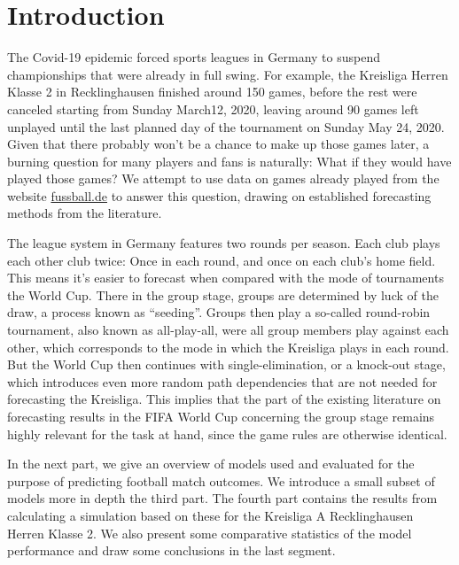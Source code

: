 \documentclass[12pt,a4paper]{article}
\begin{document}
\hypertarget{introduction}{%
\section{Introduction}\label{introduction}}

The Covid-19 epidemic forced sports leagues in Germany to suspend
championships that were already in full swing. For example, the
Kreisliga Herren Klasse 2 in Recklinghausen finished around 150 games,
before the rest were canceled starting from Sunday March12, 2020,
leaving around 90 games left unplayed until the last planned day of the
tournament on Sunday May 24, 2020. Given that there probably won't be a
chance to make up those games later, a burning question for many players
and fans is naturally: What if they would have played those games? We
attempt to use data on games already played from the website
\href{http://www.fussball.de/spielplan/re-kl-a-2-kreis-recklinghausen-kreisliga-a-herren-saison1920-westfalen/-/staffel/027II28DS800000DVS5489B3VS3GHJJU-G\#!/section/matchplan}{fussball.de}
to answer this question, drawing on established forecasting methods from
the literature.

The league system in Germany features two rounds per season. Each club
plays each other club twice: Once in each round, and once on each club's
home field. This means it's easier to forecast when compared with the
mode of tournaments the World Cup. There in the group stage, groups are
determined by luck of the draw, a process known as \enquote{seeding}.
Groups then play a so-called round-robin tournament, also known as
all-play-all, were all group members play against each other, which
corresponds to the mode in which the Kreisliga plays in each round. But
the World Cup then continues with single-elimination, or a knock-out
stage, which introduces even more random path dependencies that are not
needed for forecasting the Kreisliga. This implies that the part of the
existing literature on forecasting results in the FIFA World Cup
concerning the group stage remains highly relevant for the task at hand,
since the game rules are otherwise identical.

In the next part, we give an overview of models used and evaluated for
the purpose of predicting football match outcomes. We introduce a small
subset of models more in depth the third part. The fourth part contains
the results from calculating a simulation based on these for the
Kreisliga A Recklinghausen Herren Klasse 2. We also present some
comparative statistics of the model performance and draw some
conclusions in the last segment.
\end{document}
